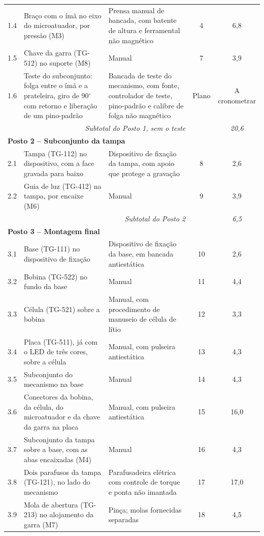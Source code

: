 {\begin{longtable}{@{}c >{\raggedright\arraybackslash}p{5.4cm} >{\raggedright\arraybackslash}p{4.4cm} c c@{}}
1.4 & Braço com o ímã no eixo do microatuador, por pressão (M3) & Prensa manual de bancada, com batente de altura e ferramental não magnético & 4 & 6,8 \\
1.5 & Chave da garra (TG-512) no suporte (M8) & Manual & 7 & 3,9 \\
1.6 & Teste do subconjunto: folga entre o ímã e a prateleira, giro de 90$^\circ$ com retorno e liberação de um pino-padrão & Bancada de teste do mecanismo, com fonte, controlador de teste, pino-padrão e calibre de folga não magnético & Plano & A cronometrar \\
\multicolumn{3}{r}{\textit{Subtotal do Posto 1, sem o teste}} & & \textit{20,6} \\
\hline
\multicolumn{5}{l}{\textbf{Posto 2 -- Subconjunto da tampa}} \\
2.1 & Tampa (TG-112) no dispositivo, com a face gravada para baixo & Dispositivo de fixação da tampa, com apoio que protege a gravação & 8 & 2,6 \\
2.2 & Guia de luz (TG-412) na tampa, por encaixe (M6) & Manual & 9 & 3,9 \\
\multicolumn{3}{r}{\textit{Subtotal do Posto 2}} & & \textit{6,5} \\
\hline
\multicolumn{5}{l}{\textbf{Posto 3 -- Montagem final}} \\
3.1 & Base (TG-111) no dispositivo de fixação & Dispositivo de fixação da base, em bancada antiestática & 10 & 2,6 \\
3.2 & Bobina (TG-522) no fundo da base & Manual & 11 & 4,4 \\
3.3 & Célula (TG-521) sobre a bobina & Manual, com procedimento de manuseio de célula de lítio & 12 & 3,3 \\
3.4 & Placa (TG-511), já com o LED de três cores, sobre a célula & Manual, com pulseira antiestática & 13 & 4,3 \\
3.5 & Subconjunto do mecanismo na base & Manual & 14 & 4,3 \\
3.6 & Conectores da bobina, da célula, do microatuador e da chave da garra na placa & Manual, com pulseira antiestática & 15 & 16,0 \\
3.7 & Subconjunto da tampa sobre a base, com as abas encaixadas (M4) & Manual & 16 & 4,3 \\
3.8 & Dois parafusos da tampa (TG-121), no lado do mecanismo & Parafusadeira elétrica com controle de torque e ponta não imantada & 17 & 17,0 \\
3.9 & Mola de abertura (TG-213) no alojamento da garra (M7) & Pinça; molas fornecidas separadas & 18 & 4,5 \\

\end{longtable}}
